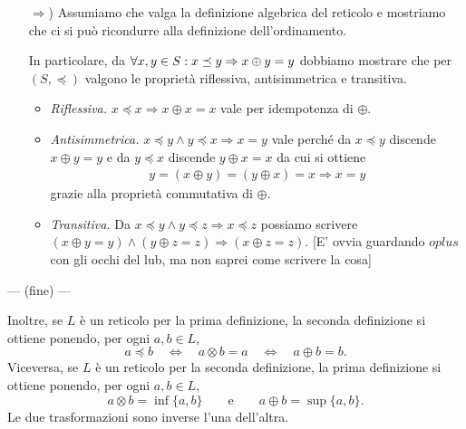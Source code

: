 \begin{proposizione}
\begin{itemize}
\begin{itemize}
Vale il ragionamento analogo per $w$. Prendiamo $w'=ub\{x,y,z\}$. Sappiamo 
quindi che $b \preceq w'$, e $z \preceq w'$, da cui segue che $w \preceq w'$ 
in quanto $w$ è il \emph{lub} di $x, y, z$.

Avendo già dimostrato l'unicità di \emph{lub} e \emph{glb} (\textup{\ref{prop:unicita_lub_glb}}), sappiamo che il \emph{lub} se esite è 
unico, quindi $v = w$.

Vale la duale per $\otimes$.
\end{itemize}

\item[$\Rightarrow$)] Assumiamo che valga la definizione algebrica del 
reticolo e mostriamo che ci si può ricondurre alla definizione 
dell'ordinamento.

In particolare, da $\forall x,y \in S \mathrel{:} x \preceq y \Rightarrow x \oplus y = y$ dobbiamo mostrare che per $(S, \preceq)$ valgono le proprietà riflessiva, antisimmetrica e transitiva. 
\begin{itemize}
\item \emph{Riflessiva.} $x \preceq x \Rightarrow x \oplus x = x$ vale per idempotenza di $\oplus$.
\item \emph{Antisimmetrica.} $x \preceq y \land y \preceq x \Rightarrow x = y$ vale perché da $x \preceq y$ discende $x \oplus y = y$ e da $y \preceq x$ discende $y \oplus x = x$ da cui si ottiene
\begin{align*}
    y = (x \oplus y) = (y \oplus x) = x \Rightarrow x = y
\end{align*}
grazie alla proprietà commutativa di $\oplus$.
\item \emph{Transitiva.} Da $x \preceq y \land y \preceq z \Rightarrow x \preceq z$ possiamo scrivere $(x \oplus y = y) \land (y \oplus z = z) \Rightarrow (x \oplus z = z)$.
[E' ovvia guardando $oplus$ con gli occhi del lub, ma non saprei come scrivere la cosa]
\end{itemize}
\end{itemize}

--- (fine) ---

Inoltre, se $L$ \`e
un reticolo per la prima definizione, la seconda definizione si ottiene
ponendo, per ogni $a,b \in L$,
\[
    a \preceq b \quad\iff\quad a \otimes b = a \quad\iff\quad a \oplus b = b.
\]
Viceversa, se $L$ \`e un reticolo per la seconda definizione,
la prima definizione si ottiene ponendo, per ogni $a,b \in L$,
\[
    a \otimes b = \inf\{a,b\} \qquad\mbox{e}\qquad a \oplus b = \sup\{a,b\}.
\]
Le due trasformazioni sono inverse l'una dell'altra.
\end{proposizione}

